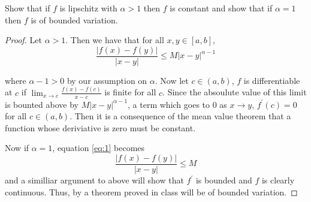 \documentclass[11pt,largemargins]{homework}
\begin{document}
 
\maketitle
\question 
Show that if $f$ is lipschitz with $\alpha > 1$ then 
$f$ is constant and show that if $\alpha = 1$ then 
$f$ is of bounded variation. 

\begin{proof} 
Let $\alpha >1$. Then  we have that for all $x, y \in [a, b]$, 
\begin{equation} 
\label{eq:1}
\frac{|f(x) - f(y)|}{|x-y|} \leq M|x - y|^{\alpha -1}
\end{equation}

where $\alpha - 1 > 0$ by our assumption on $\alpha$. Now let $c \in (a, b)$, 
$f$ is differentiable at $c$ if $\lim_{x \to c} \frac{f(x) - f(c)}{x- c} $ is finite for all $c$. 
Since the absoulute value of this limit is bounted above by $M|x - y|^{\alpha -1}$, a term which goes to 0 as $x \to y$, 
$f^\prime (c) = 0$ for all $c \in (a, b)$. Then it is a consequence of the mean value theorem that a function whose deriviative is zero must 
be constant. 

Now if $\alpha = 1$, equation \ref{eq:1} becomes 
\[ \frac{|f(x) - f(y)|}{|x-y|} \leq M \]
and a similliar argument to above will show that $f^\prime$ is bounded and $f$ is clearly continuous. Thus, by a theorem proved in class will be of bounded variation. 

\end{proof}

\question 
\end{document}
